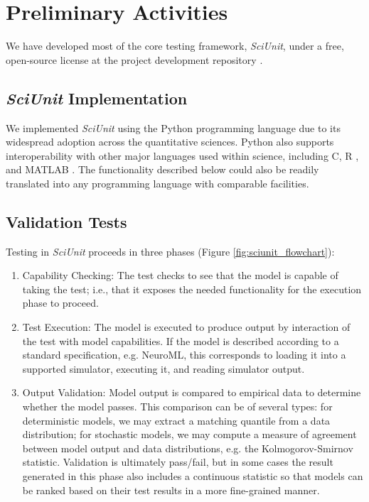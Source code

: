 \documentclass[11pt,letterpaper]{article}
\begin{document}
\section{Preliminary Activities}
We have developed most of the core testing framework, \textit{SciUnit}, under a free, open-source license at the project development repository \cite{sciunit_url}.  

\subsection{\textit{SciUnit} Implementation} We implemented \textit{SciUnit} using the Python programming language \cite{python} due to its widespread adoption across the quantitative sciences. Python also supports interoperability with other major languages used within science, including C, R \cite{r_url}, and MATLAB \cite{matlab_url}. The functionality described below could also be readily translated into any programming language with comparable facilities.

\subsection{Validation Tests}\label{sec:validation_tests} 
Testing in \textit{SciUnit} proceeds in three phases (Figure \ref{fig:sciunit_flowchart}): 
\begin{enumerate}
\item Capability Checking: The test checks to see that the model is capable of taking the test; i.e., that it exposes the needed functionality for the execution phase to proceed.
\item Test Execution: The model is executed to produce output by interaction of the test with model capabilities.  If the model is described according to a standard specification, e.g. NeuroML, this corresponds to loading it into a supported simulator, executing it, and reading simulator output. 
\item Output Validation: Model output is compared to empirical data to determine whether the model passes.  This comparison can be of several types: for deterministic models, we may extract a matching quantile from a data distribution; for stochastic models, we may compute a measure of agreement between model output and data distributions, e.g. the Kolmogorov-Smirnov statistic.  Validation is ultimately pass/fail, but in some cases the result generated in this phase also includes a continuous statistic so that models can be ranked based on their test results in a more fine-grained manner.   
\end{enumerate}
\end{document}
